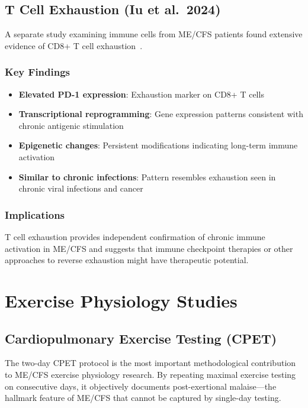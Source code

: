 \subsection{T Cell Exhaustion (Iu et al.\ 2024)}

A separate study examining immune cells from ME/CFS patients found extensive evidence of CD8+ T cell exhaustion~\cite{iu2024tcell_exhaustion}.

\subsubsection{Key Findings}
\begin{itemize}
    \item \textbf{Elevated PD-1 expression}: Exhaustion marker on CD8+ T cells
    \item \textbf{Transcriptional reprogramming}: Gene expression patterns consistent with chronic antigenic stimulation
    \item \textbf{Epigenetic changes}: Persistent modifications indicating long-term immune activation
    \item \textbf{Similar to chronic infections}: Pattern resembles exhaustion seen in chronic viral infections and cancer
\end{itemize}

\subsubsection{Implications}
T cell exhaustion provides independent confirmation of chronic immune activation in ME/CFS and suggests that immune checkpoint therapies or other approaches to reverse exhaustion might have therapeutic potential.

\section{Exercise Physiology Studies}
\label{sec:exercise-physiology}

\subsection{Cardiopulmonary Exercise Testing (CPET)}

The two-day CPET protocol is the most important methodological contribution to ME/CFS exercise physiology research. By repeating maximal exercise testing on consecutive days, it objectively documents post-exertional malaise---the hallmark feature of ME/CFS that cannot be captured by single-day testing.


